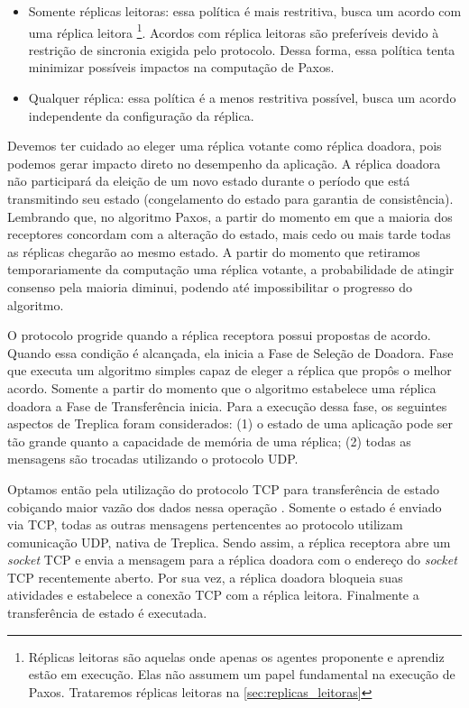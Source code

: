 \begin{itemize}
  \item Somente réplicas leitoras: essa política é mais restritiva, busca um acordo com
    uma réplica leitora \footnote{Réplicas leitoras são aquelas onde apenas os agentes
    proponente e aprendiz estão em execução. Elas não assumem um papel fundamental na
    execução de Paxos. Trataremos réplicas leitoras na \autoref{sec:replicas_leitoras}}.
    Acordos com réplica leitoras são preferíveis devido à restrição de sincronia exigida
    pelo protocolo. Dessa forma, essa política tenta minimizar possíveis impactos na
    computação de Paxos.
  \item Qualquer réplica: essa política é a menos restritiva possível, busca um acordo
    independente da configuração da réplica.
\end{itemize}

Devemos ter cuidado ao eleger uma réplica votante como réplica doadora, pois podemos gerar
impacto direto no desempenho da aplicação. A réplica doadora não participará da eleição de
um novo estado durante o período que está transmitindo seu estado (congelamento do estado
para garantia de consistência). Lembrando que, no algoritmo Paxos, a partir do momento em
que a maioria dos receptores concordam com a alteração do estado, mais cedo ou mais tarde
todas as réplicas chegarão ao mesmo estado. A partir do momento que retiramos
temporariamente da computação uma réplica votante, a probabilidade de atingir consenso
pela maioria diminui, podendo até impossibilitar o progresso do algoritmo.

O protocolo progride quando a réplica receptora possui propostas de acordo. Quando essa
condição é alcançada, ela inicia a Fase de Seleção de Doadora. Fase que executa um
algoritmo simples capaz de eleger a réplica que propôs o melhor acordo. Somente a partir
do momento que o algoritmo estabelece uma réplica doadora a Fase de Transferência inicia.
Para a execução dessa fase, os seguintes aspectos de Treplica foram considerados: (1) o
estado de uma aplicação pode ser tão grande quanto a capacidade de memória de uma réplica;
(2) todas as mensagens são trocadas utilizando o protocolo UDP.

Optamos então pela utilização do protocolo TCP para transferência de estado cobiçando
maior vazão dos dados nessa operação \cite{abdellatif04}. Somente o estado é enviado via
TCP, todas as outras mensagens pertencentes ao protocolo utilizam comunicação UDP, nativa
de Treplica. Sendo assim, a réplica receptora abre um \emph{socket} TCP e envia a mensagem
 para a réplica doadora com o endereço do \emph{socket} TCP
recentemente aberto. Por sua vez, a réplica doadora bloqueia suas atividades e estabelece
a conexão TCP com a réplica leitora. Finalmente a transferência de estado é executada.

